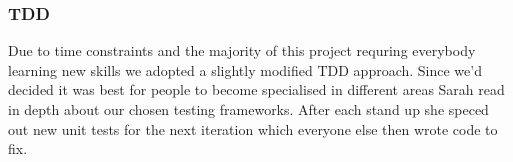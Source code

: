  \subsubsection{TDD}
    Due to time constraints and the majority of this project requring everybody learning new skills we adopted a slightly modified TDD approach. Since we'd decided it was best for people to become specialised in different areas Sarah read in depth about our chosen testing frameworks. After each stand up she speced out new unit tests for the next iteration which everyone else then wrote code to fix.